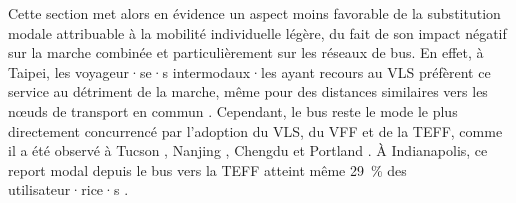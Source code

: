 \begin{refsegment}
Cette section met alors en évidence un aspect moins favorable de la substitution modale attribuable à la mobilité individuelle légère, du fait de son impact négatif sur la marche combinée et particulièrement sur les réseaux de bus. En effet, à Taipei, les voyageur·se·s intermodaux·les ayant recours au \acrshort{VLS} préfèrent ce service au détriment de la marche, même pour des distances similaires vers les nœuds de transport en commun \textcolor{blue}{\autocite[8]{yen_how_2023}}. Cependant, le bus reste le mode le plus directement concurrencé par l'adoption du \acrshort{VLS}, du \acrshort{VFF} et de la \acrshort{TEFF}, comme il a été observé à Tucson \textcolor{blue}{\autocite[16]{li_investigating_2022}}, Nanjing \textcolor{blue}{\autocite[12]{chen_what_2022}}, Chengdu \textcolor{blue}{\autocite[107]{ma_impacts_2019}} et Portland \textcolor{blue}{\autocite[411]{mcqueen_assessing_2022}}. À Indianapolis, ce report modal depuis le bus vers la \acrshort{TEFF} atteint même 29~\% des utilisateur·rice·s \textcolor{blue}{\autocite[10]{luo_are_2021}}.%


\end{refsegment}
